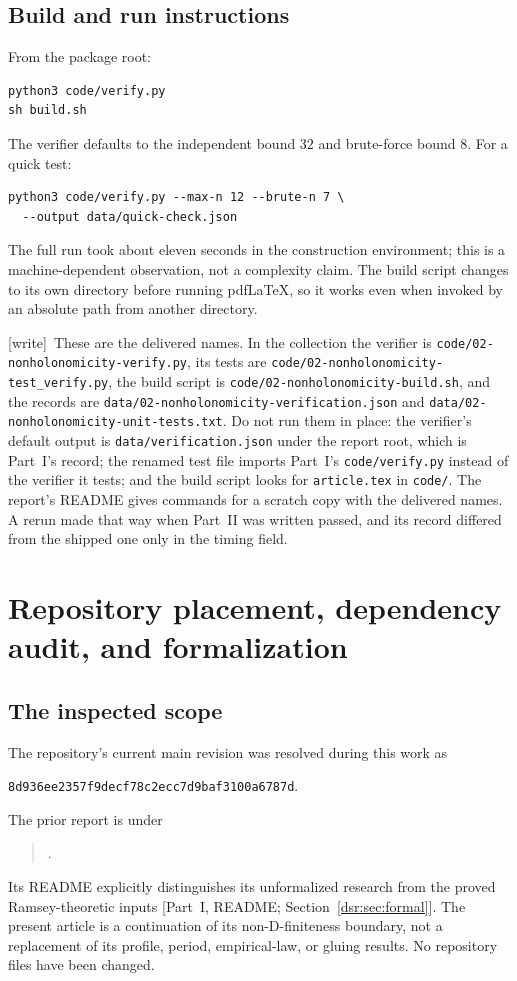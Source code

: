 \documentclass[11pt,a4paper]{article}
\numberwithin{equation}{section}
\theoremstyle{definition}
\theoremstyle{remark}
\newcommand{\wtag}{\textup{[write]}}
\newcommand{\lean}[1]{\nolinkurl{#1}}
\newcommand{\partref}[1]{\textup{[}Part~I, #1\textup{]}}
\theoremstyle{definition}
\theoremstyle{plain}
\begin{document}
\subsection{Build and run instructions}
From the package root:
\begin{verbatim}
python3 code/verify.py
sh build.sh
\end{verbatim}
The verifier defaults to the independent bound $32$ and brute-force bound
$8$. For a quick test:
\begin{verbatim}
python3 code/verify.py --max-n 12 --brute-n 7 \
  --output data/quick-check.json
\end{verbatim}
The full run took about eleven seconds in the construction environment;
this is a machine-dependent observation, not a complexity claim. The
build script changes to its own directory before running pdfLaTeX, so it
works even when invoked by an absolute path from another directory.

{\raggedright\wtag\ These are the delivered names. In the collection the verifier is
\lean{code/02-nonholonomicity-verify.py}, its tests are
\lean{code/02-nonholonomicity-test_verify.py}, the build script is
\lean{code/02-nonholonomicity-build.sh}, and the records are
\lean{data/02-nonholonomicity-verification.json} and
\lean{data/02-nonholonomicity-unit-tests.txt}. Do not run them in place:
the verifier's default output is \lean{data/verification.json} under the
report root, which is Part~I's record; the renamed test file imports
Part~I's \lean{code/verify.py} instead of the verifier it tests; and the
build script looks for \lean{article.tex} in \lean{code/}. The report's
README gives commands for a scratch copy with the delivered names. A rerun
made that way when Part~II was written passed, and its record differed
from the shipped one only in the timing field.\par}

\section{Repository placement, dependency audit, and formalization}
\label{dsr:nh:sec:audit}
\subsection{The inspected scope}
The repository's current main revision was resolved during this work as
\begin{center}\small\texttt{8d936ee2357f9decf78c2ecc7d9baf3100a6787d}.\end{center}
The prior report is under
\begin{quote}\small\raggedright
{}\par
{}\par
{}.
\end{quote}
Its README explicitly distinguishes its unformalized research from the
proved Ramsey-theoretic inputs \partref{README; Section~\ref{dsr:sec:formal}}. The present article is
a continuation of its non-D-finiteness boundary, not a replacement of its
profile, period, empirical-law, or gluing results. No repository files have
been changed.
\end{document}

